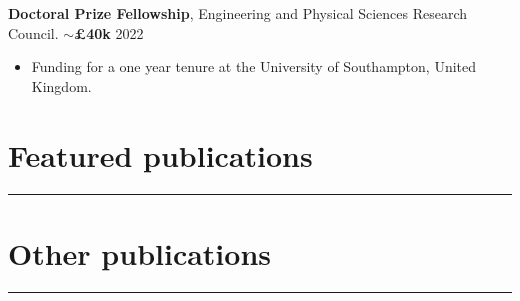 \documentclass[10.5pt, oneside]{article}   	%
\begin{document}
\textbf{Doctoral Prize Fellowship}, Engineering and Physical Sciences Research Council. $\sim$\textbf{£40k} \hfill 2022 \\
\vspace{-5mm}
\begin{itemize}
\item Funding for a one year tenure at the University of Southampton, United Kingdom.
\end{itemize}

%



{\color{Sectioncolour}
\section*{Featured publications}
\vspace{-3mm}
\noindent\rule{\linewidth}{0.6pt}}

\vspace{-5mm}
\printbibliography[keyword={feature},title={~}]

{\color{Sectioncolour}
\section*{Other publications}
\vspace{-3mm}
\noindent\rule{\linewidth}{0.6pt}}

\vspace{-5mm}
\printbibliography[notkeyword={feature},title={~}]


\end{document}
